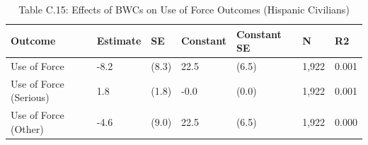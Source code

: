 \begin{table}

\caption{Table C.15: Effects of BWCs on Use of Force Outcomes (Hispanic Civilians)}
\centering
\begin{tabular}[t]{lllllll}
\toprule
Outcome & Estimate & SE & Constant & Constant SE & N & R2\\
\midrule
Use of Force & -8.2 & (8.3) & 22.5 & (6.5) & 1,922 & 0.001\\
Use of Force (Serious) & 1.8 & (1.8) & -0.0 & (0.0) & 1,922 & 0.001\\
Use of Force (Other) & -4.6 & (9.0) & 22.5 & (6.5) & 1,922 & 0.000\\
\bottomrule
\end{tabular}
\end{table}
